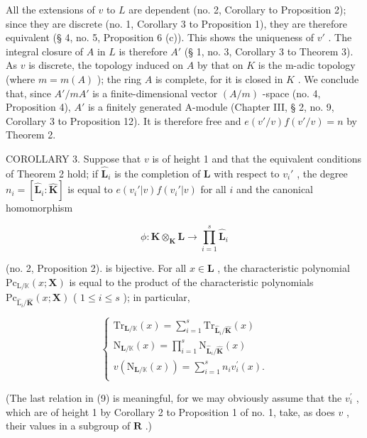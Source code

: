 All the extensions of \(v\) to \(L\) are dependent (no. 2, Corollary to Proposition 2); since they are discrete (no. 1, Corollary 3 to Proposition 1), they are therefore equivalent (§ 4, no. 5, Proposition 6 (c)). This shows the uniqueness of \(v'\) . The integral closure of \(A\) in \(L\) is therefore \(A'\) (§ 1, no. 3, Corollary 3 to Theorem 3). As \(v\) is discrete, the topology induced on \(A\) by that on \(K\) is the m-adic topology (where \(m = m(A)\) ); the ring \(A\) is complete, for it is closed in \(K\) . We conclude that, since \(A'/mA'\) is a finite-dimensional vector \((A/m)\) -space (no. 4, Proposition 4), \(A'\) is a finitely generated A-module (Chapter III, § 2, no. 9, Corollary 3 to Proposition 12). It is therefore free and \(e(v'/v)f(v'/v) = n\) by Theorem 2.

COROLLARY 3. Suppose that \(v\) is of height 1 and that the equivalent conditions of Theorem 2 hold; if \(\hat{\mathbf{L}}_i\) is the completion of \(\mathbf{L}\) with respect to \(v_i'\) , the degree \(n_i = [\hat{\mathbf{L}}_i: \hat{\mathbf{K}}]\) is equal to \(e(v_i'|v)f(v_i'|v)\) for all \(i\) and the canonical homomorphism

\[
\phi \colon \hat {\mathbf {K}} \otimes_ {\mathbf {K}} \mathbf {L} \rightarrow \prod_ {i = 1} ^ {s} \hat {\mathbf {L}} _ {i}
\]

(no. 2, Proposition 2). is bijective. For all \(x \in \mathbf{L}\) , the characteristic polynomial \(\mathrm{Pc}_{\mathrm{L} / \mathbb{K}}(x; \mathbf{X})\) is equal to the product of the characteristic polynomials \(\mathrm{Pc}_{\hat{\mathrm{L}}_i / \hat{\mathbf{K}}}(x; \mathbf{X})\) ( \(1 \leqslant i \leqslant s\) ); in particular,

\[
\left\{ \begin{array} { l } \mathrm{Tr} _ { \mathbf { L } / \mathbb { K } } ( x ) = \sum _ { i = 1 } ^ { s } \mathrm{Tr} _ { \hat { \mathbf { L } } _ { i } / \hat { \mathbf { K } } } ( x ) \\ \mathrm{N} _ { \mathbf { L } / \mathbb { K } } ( x ) = \prod _ { i = 1 } ^ { s } \mathrm{N} _ { \hat { \mathbf { L } } _ { i } / \hat { \mathbf { K } } } ( x ) \\ v ( \mathrm{N} _ { \mathbf { L } / \mathbb { K } } ( x ) ) = \sum _ { i = 1 } ^ { s } n _ { i } v _ { i } ^ { \prime } ( x ) . \\ \end{array} \right.\tag{9}
\]

(The last relation in (9) is meaningful, for we may obviously assume that the \(v_{i}^{\prime}\) , which are of height 1 by Corollary 2 to Proposition 1 of no. 1, take, as does \(v\) , their values in a subgroup of \(\mathbf{R}\) .)


